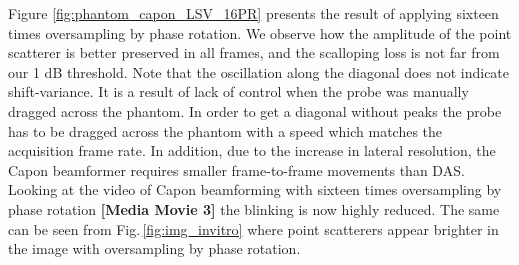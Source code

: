\documentclass[draftcls]{IEEEtran}
\newcommand\multimedia[1]{\textbf{{\color{red}[#1]}}}
\begin{document}
Figure \ref{fig:phantom_capon_LSV_16PR} presents the result of applying sixteen times oversampling by phase rotation. We observe how the amplitude of the point scatterer is better preserved in all frames, and the scalloping loss is not far from our 1 dB threshold. Note that the oscillation along the diagonal does not indicate shift-variance. It is a result of lack of control when the probe was manually dragged across the phantom. In order to get a diagonal without peaks the probe has to be dragged across the phantom with a speed which matches the acquisition frame rate. In addition, due to the increase in lateral resolution, the Capon beamformer requires smaller frame-to-frame movements than DAS. Looking at the video of Capon beamforming with sixteen times oversampling by phase rotation \multimedia{Media Movie 3} the blinking is now highly reduced. The same can be seen from Fig.\,\ref{fig:img_invitro} where point scatterers appear brighter in the image with oversampling by phase rotation.%



\end{document}
